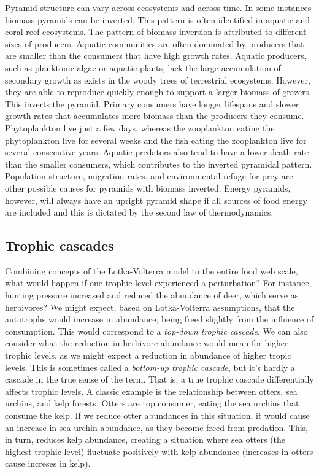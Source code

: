 \documentclass[12pt]{article}
\begin{document}
Pyramid structure can vary across ecosystems and across time. In some instances biomass pyramids can be inverted. This pattern is often identified in aquatic and coral reef ecosystems. The pattern of biomass inversion is attributed to different sizes of producers. Aquatic communities are often dominated by producers that are smaller than the consumers that have high growth rates. Aquatic producers, such as planktonic algae or aquatic plants, lack the large accumulation of secondary growth as exists in the woody trees of terrestrial ecosystems. However, they are able to reproduce quickly enough to support a larger biomass of grazers. This inverts the pyramid. Primary consumers have longer lifespans and slower growth rates that accumulates more biomass than the producers they consume. Phytoplankton live just a few days, whereas the zooplankton eating the phytoplankton live for several weeks and the fish eating the zooplankton live for several consecutive years. Aquatic predators also tend to have a lower death rate than the smaller consumers, which contributes to the inverted pyramidal pattern. Population structure, migration rates, and environmental refuge for prey are other possible causes for pyramids with biomass inverted. Energy pyramids, however, will always have an upright pyramid shape if all sources of food energy are included and this is dictated by the second law of thermodynamics.




\bigskip
\subsection*{Trophic cascades}

Combining concepts of the Lotka-Volterra model to the entire food web scale, what would happen if one trophic level experienced a perturbation? For instance, hunting pressure increased and reduced the abundance of deer, which serve as herbivores? We might expect, based on Lotka-Volterra assumptions, that the autotrophs would increase in abundance, being freed slightly from the influence of consumption. This would correspond to a \textit{top-down trophic cascade}. We can also consider what the reduction in herbivore abundance would mean for higher trophic levels, as we might expect a reduction in abundance of higher tropic levels. This is sometimes called a \textit{bottom-up trophic cascade}, but it's hardly a cascade in the true sense of the term. That is, a true trophic cascade differentially affects trophic levels. A classic example is the relationship between otters, sea urchins, and kelp forests. Otters are top consumer, eating the sea urchins that consume the kelp. If we reduce otter abundances in this situation, it would cause an increase in sea urchin abundance, as they become freed from predation. This, in turn, reduces kelp abundance, creating a situation where sea otters (the highest trophic level) fluctuate positively with kelp abundance (increases in otters cause increses in kelp). 
\end{document}
